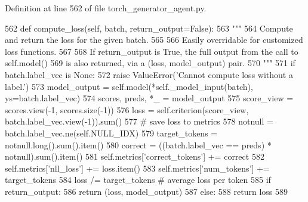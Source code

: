 Definition at line 562 of file torch\+\_\+generator\+\_\+agent.\+py.


\begin{DoxyCode}
562     \textcolor{keyword}{def }compute\_loss(self, batch, return\_output=False):
563         \textcolor{stringliteral}{"""}
564 \textcolor{stringliteral}{        Compute and return the loss for the given batch.}
565 \textcolor{stringliteral}{}
566 \textcolor{stringliteral}{        Easily overridable for customized loss functions.}
567 \textcolor{stringliteral}{}
568 \textcolor{stringliteral}{        If return\_output is True, the full output from the call to self.model()}
569 \textcolor{stringliteral}{        is also returned, via a (loss, model\_output) pair.}
570 \textcolor{stringliteral}{        """}
571         \textcolor{keywordflow}{if} batch.label\_vec \textcolor{keywordflow}{is} \textcolor{keywordtype}{None}:
572             \textcolor{keywordflow}{raise} ValueError(\textcolor{stringliteral}{'Cannot compute loss without a label.'})
573         model\_output = self.model(*self.\_model\_input(batch), ys=batch.label\_vec)
574         scores, preds, *\_ = model\_output
575         score\_view = scores.view(-1, scores.size(-1))
576         loss = self.criterion(score\_view, batch.label\_vec.view(-1)).sum()
577         \textcolor{comment}{# save loss to metrics}
578         notnull = batch.label\_vec.ne(self.NULL\_IDX)
579         target\_tokens = notnull.long().sum().item()
580         correct = ((batch.label\_vec == preds) * notnull).sum().item()
581         self.metrics[\textcolor{stringliteral}{'correct\_tokens'}] += correct
582         self.metrics[\textcolor{stringliteral}{'nll\_loss'}] += loss.item()
583         self.metrics[\textcolor{stringliteral}{'num\_tokens'}] += target\_tokens
584         loss /= target\_tokens  \textcolor{comment}{# average loss per token}
585         \textcolor{keywordflow}{if} return\_output:
586             \textcolor{keywordflow}{return} (loss, model\_output)
587         \textcolor{keywordflow}{else}:
588             \textcolor{keywordflow}{return} loss
589 
\end{DoxyCode}
\mbox{\label{classparlai_1_1core_1_1torch__generator__agent_1_1TorchGeneratorAgent_ac584268dd08c6fcb0045aa968cad8561}} 
